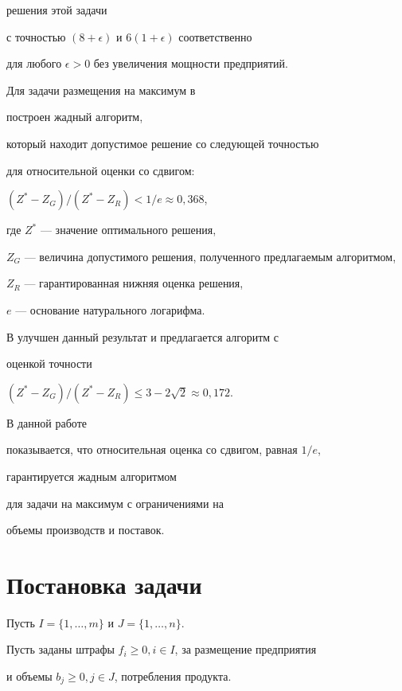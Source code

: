 решения этой задачи


с точностью $(8+ \epsilon)$ и $6(1+\epsilon)$ соответственно


для любого $\epsilon >0$ без увеличения мощности предприятий. 





Для задачи размещения на максимум в \cite{CFN77}


построен жадный алгоритм,


который находит допустимое решение со следующей точностью


для относительной оценки со сдвигом:


$(Z^*-Z_G)/(Z^*-Z_R) < 1/e\approx 0{,}368$,


где $Z^*$ --- значение оптимального решения,


$Z_G$ --- величина допустимого решения, полученного предлагаемым алгоритмом,


$Z_R$ --- гарантированная нижняя оценка решения,


$e$ --- основание натурального логарифма.


В \cite{AS99} улучшен данный результат и предлагается алгоритм с 


оценкой точности 


$(Z^*-Z_G)/(Z^*-Z_R) \le 3- 2\sqrt{2} 


\approx 0{,}172$.





В данной работе 


показывается, что относительная оценка со сдвигом, равная $1/e$,


гарантируется жадным алгоритмом 


для задачи на максимум с ограничениями на 


объемы производств и поставок.





\section{Постановка задачи}





Пусть $I = \{1, \dotsc, m \}$ и $J = \{1, \dotsc, n \}$.


Пусть заданы штрафы $f_{i} \geq 0, i \in I$, за размещение предприятия 


и объемы $b_{j} \ge 0, j \in J$, потребления продукта.


